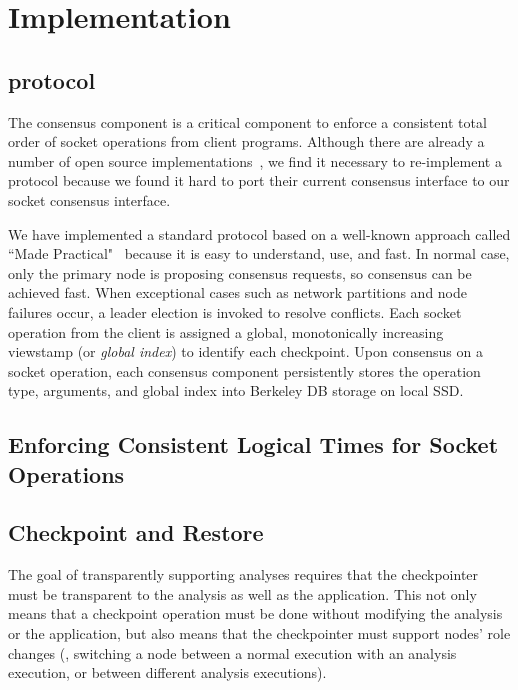 \section{Implementation} \label{sec:impl}

\subsection{\paxos protocol} \label{sec:paxos}
The \paxos consensus component is a critical component to enforce a consistent 
total order of socket operations from client programs. Although there are 
already a number of open source \paxos implementations~\cite{concoord, 
zookeeper, chubby:osdi, libpaxos}, we find it necessary to re-implement a 
\paxos protocol because \xxx we found it hard to port their current consensus 
interface to our socket consensus interface.

We have implemented a standard \paxos protocol based on a well-known approach 
called ``\paxos Made Practical"~\cite{paxos:practical} because it is easy to 
understand, use, and fast. In normal case, only the primary node is proposing 
consensus requests, so consensus can be achieved fast. When exceptional cases 
such as network partitions and node failures occur, a \paxos leader election is 
invoked to resolve conflicts. Each socket operation from the client is assigned 
a global, monotonically increasing viewstamp (or \emph{global index}) to 
identify each checkpoint. Upon consensus on a socket operation, each consensus 
component persistently stores the operation type, arguments, and global index 
into Berkeley DB storage on local SSD.

\subsection{Enforcing Consistent Logical Times for Socket Operations} 
\label{sec:timing}

\subsection{Checkpoint and Restore} \label{sec:checkpoint}

The goal of transparently supporting analyses requires that the checkpointer 
must be transparent to the analysis as well as the application. This not only 
means that a checkpoint operation must be done without modifying the analysis 
or the application, but also means that the checkpointer must support nodes' 
role changes (\eg, switching a node between a normal execution with an analysis 
execution, or between different analysis executions).

